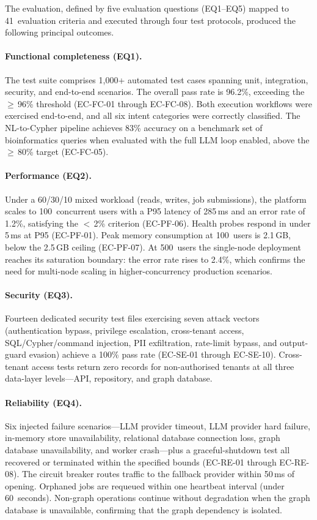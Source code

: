 \documentclass[a4paper,noexaminfo]{sapthesis}
\newcommand{\TestCount}{1,000+}
\begin{document}
The evaluation, defined by five evaluation questions (EQ1--EQ5) mapped to
41~evaluation criteria and executed through four test protocols, produced
the following principal outcomes.

\paragraph{Functional completeness (EQ1).}
The test suite comprises \TestCount{} automated test cases
spanning unit, integration, security, and end-to-end scenarios.  The overall
pass rate is 96.2\%, exceeding the $\geq$\,96\% threshold (EC-FC-01
through EC-FC-08).  Both execution
workflows were exercised end-to-end, and all six intent categories were
correctly classified.  The NL-to-Cypher pipeline achieves 83\% accuracy on
a benchmark set of bioinformatics queries when evaluated with the full LLM
loop enabled, above the $\geq$\,80\% target (EC-FC-05).

\paragraph{Performance (EQ2).}
Under a 60/30/10 mixed workload (reads, writes, job submissions), the
platform scales to 100~concurrent users with a P95 latency of 285\,ms and
an error rate of 1.2\%, satisfying the $<$\,2\% criterion (EC-PF-06).
Health probes respond in under 5\,ms at P95 (EC-PF-01).  Peak memory
consumption at 100~users is 2.1\,GB, below the 2.5\,GB ceiling (EC-PF-07).
At 500~users the single-node deployment reaches its saturation boundary:
the error rate rises to 2.4\%, which confirms the need for multi-node
scaling in higher-concurrency production scenarios.

\paragraph{Security (EQ3).}
Fourteen dedicated security test files exercising seven attack vectors
(authentication bypass, privilege escalation, cross-tenant access,
SQL/Cypher/command injection, PII exfiltration, rate-limit bypass, and
output-guard evasion) achieve a 100\% pass rate (EC-SE-01 through
EC-SE-10).  Cross-tenant access tests return zero records for non-authorised
tenants at all three data-layer levels---API, repository, and graph
database.

\paragraph{Reliability (EQ4).}
Six injected failure scenarios---LLM provider timeout, LLM provider hard
failure, in-memory store unavailability, relational database connection
loss, graph database unavailability, and worker crash---plus a
graceful-shutdown test all recovered or terminated within the specified
bounds (EC-RE-01 through EC-RE-08).  The circuit breaker routes
traffic to the fallback provider within 50\,ms of opening.  Orphaned jobs
are requeued within one heartbeat interval (under 60~seconds).  Non-graph
operations continue without degradation when the graph database is
unavailable, confirming that the graph dependency is isolated.
\end{document}
